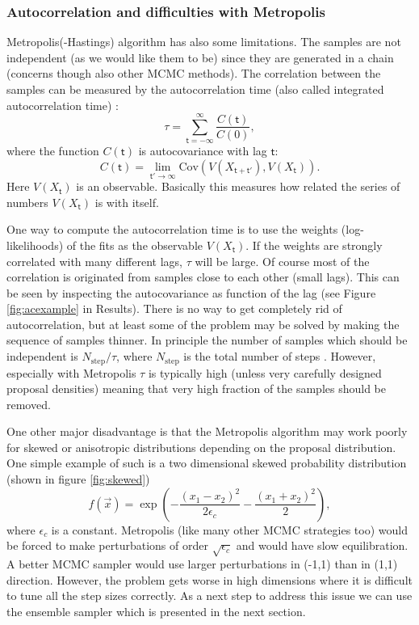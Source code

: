 \documentclass{wihuri}
\def\be{\begin{equation}}
\def\ee{\end{equation}}
\def\tstep{\mathsf{t}}
\begin{document}
\subsubsection{Autocorrelation and difficulties with Metropolis}

Metropolis(-Hastings) algorithm has also some limitations. The samples are not independent (as we would like them to be) since they are generated in a chain (concerns though also other MCMC methods). The correlation between the samples can be measured by the autocorrelation time (also called integrated autocorrelation time) \cite{ensemble1}: 
\be \label{eq:autocorr_time}
\tau = \sum_{\tstep=-\infty}^{\infty} \frac{C(\tstep)}{C(0)} ,
\ee
where the function $C(\tstep)$ is autocovariance with lag $\tstep$:
\be \label{eq:autocovariance}
C(\tstep) = \lim_{\tstep'\to\infty}\mathrm{Cov}(V(X_{\tstep+\tstep'}),V(X_{\tstep})).
\ee
Here $V(X_{\tstep})$ is an observable. Basically this measures how related the series of numbers $V(X_{\tstep})$ is with itself. 

One way to compute the autocorrelation time is to use the weights (log-likelihoods) of the fits as the observable $V(X_{\tstep})$. If the weights are strongly correlated with many different lags, $\tau$ will be large. Of course most of the correlation is originated from samples close to each other (small lags). This can be seen by inspecting the autocovariance as function of the lag (see Figure \ref{fig:acexample} in Results). There is no way to get completely rid of autocorrelation, but at least some of the problem may be solved by making the sequence of samples thinner. In principle the number of samples which should be independent is $N_{\mathrm{step}}/\tau$, where $N_{\mathrm{step}}$ is the total number of steps \cite{kaiser}. However, especially with Metropolis $\tau$ is typically high (unless very carefully designed proposal densities) meaning that very high fraction of the samples should be removed.

One other major disadvantage is that the Metropolis algorithm may work poorly for skewed or anisotropic distributions depending on the proposal distribution. One simple example of such is a two dimensional skewed probability distribution (shown in figure \ref{fig:skewed})
\be \label{eq:skew} 
f(\vec{x}) = \exp(-\frac{(x_{1}-x_{2})^{2}}{2\epsilon_{c}}-\frac{(x_{1}+x_{2})^{2}}{2}),
\ee
where $\epsilon_{c}$  is a constant. Metropolis (like many other MCMC strategies too) would be forced to make perturbations of order $\sqrt{\epsilon_{c}}$ and would have slow equilibration. A better MCMC sampler would use larger perturbations in (-1,1) than in (1,1) direction. However, the problem gets worse in high dimensions where it is difficult to tune all the step sizes correctly. As a next step to address this issue we can use the ensemble sampler which is presented in the next section. 
\end{document}

